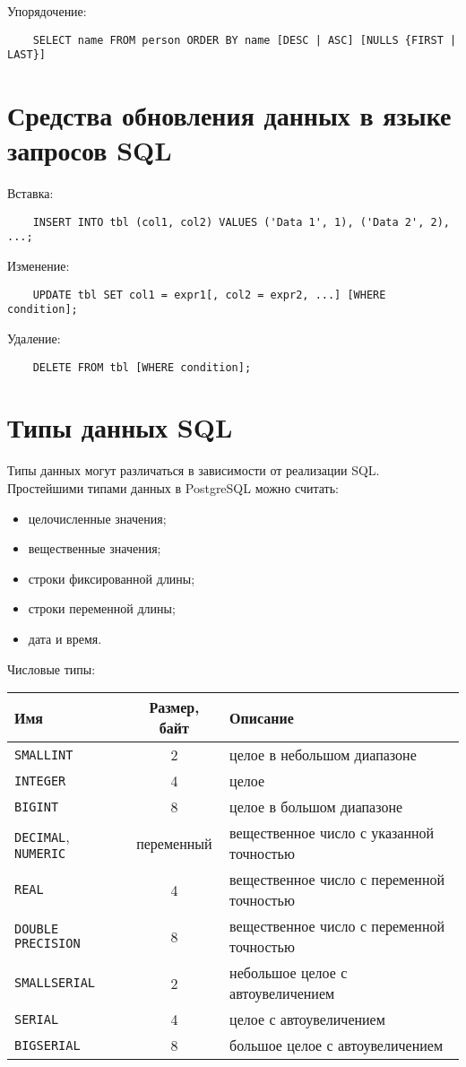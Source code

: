 Упорядочение:
\begin{verbatim}
	SELECT name FROM person ORDER BY name [DESC | ASC] [NULLS {FIRST | LAST}]
\end{verbatim}

\section{Средства обновления данных в языке запросов SQL}

Вставка:
\begin{verbatim}
	INSERT INTO tbl (col1, col2) VALUES ('Data 1', 1), ('Data 2', 2), ...;
\end{verbatim}

Изменение:
\begin{verbatim}
	UPDATE tbl SET col1 = expr1[, col2 = expr2, ...] [WHERE condition];
\end{verbatim}

Удаление:
\begin{verbatim}
	DELETE FROM tbl [WHERE condition];
\end{verbatim}

\section{Типы данных SQL}

Типы данных могут различаться в зависимости от реализации SQL.
Простейшими типами данных в PostgreSQL можно считать:
\begin{itemize}
	\item целочисленные значения;
	\item вещественные значения;
	\item строки фиксированной длины;
	\item строки переменной длины;
	\item дата и время.
\end{itemize}

Числовые типы: \\
\begin{tabular}{l | c | l}
	\textbf{Имя} & \textbf{Размер, байт} & \textbf{Описание} \\
	\hline
	\texttt{SMALLINT} & 2 & целое в небольшом диапазоне \\
	\texttt{INTEGER} & 4 & целое \\
	\texttt{BIGINT} & 8 & целое в большом диапазоне \\
	\texttt{DECIMAL}, \texttt{NUMERIC} & переменный & вещественное число с указанной точностью \\
	\texttt{REAL} & 4 & вещественное число с переменной точностью \\
	\texttt{DOUBLE PRECISION} & 8 & вещественное число с переменной точностью \\
	\texttt{SMALLSERIAL} & 2 & небольшое целое с автоувеличением \\
	\texttt{SERIAL} & 4 & целое с автоувеличением \\
	\texttt{BIGSERIAL} & 8 & большое целое с автоувеличением
\end{tabular}

